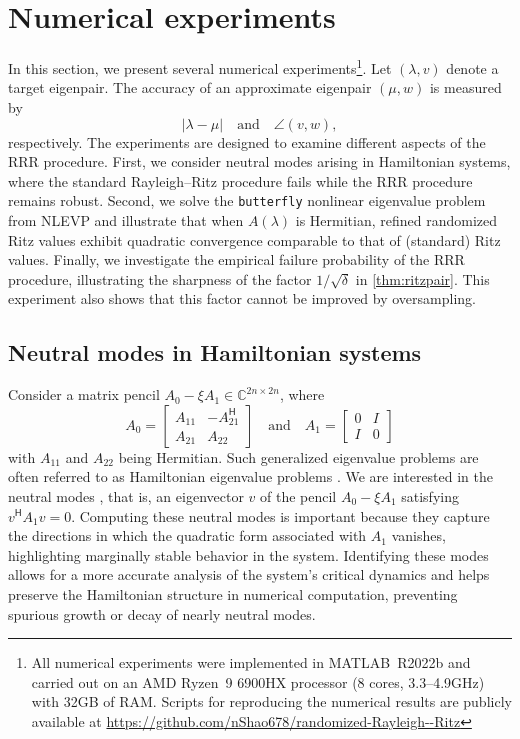\documentclass[a4paper,11pt]{article}
\newcommand{\Htran}{\mathsf{H}}
\newcommand{\C}{\mathbb{C}}
\providecommand{\abs}[1]{\lvert#1\rvert}
\begin{document}
\section{Numerical experiments}
\label{sec:numexp}
In this section, we present several numerical experiments\footnote{All numerical experiments were implemented in MATLAB~R2022b and carried out on an AMD Ryzen~9 6900HX processor (8 cores, 3.3--4.9GHz) with 32GB of RAM. Scripts for reproducing the numerical results are publicly available at \url{https://github.com/nShao678/randomized-Rayleigh--Ritz}}.
Let $(\lambda,v)$ denote a target eigenpair. The accuracy of an approximate eigenpair $(\mu,w)$ is measured by
\begin{equation}
    \label{exp:err}
    \abs{\lambda-\mu} \quad\text{and}\quad \angle(v,w),
\end{equation}
respectively.
The experiments are designed to examine different aspects of the RRR procedure. First, we consider neutral modes arising in Hamiltonian systems, where the standard Rayleigh--Ritz procedure fails while the RRR procedure remains robust. Second, we solve the \texttt{butterfly} nonlinear eigenvalue problem from NLEVP \cite{Betcke2013} and illustrate that when $A(\lambda)$ is Hermitian, refined randomized Ritz values exhibit quadratic convergence comparable to that of (standard) Ritz values. Finally, we investigate the empirical failure probability of the RRR procedure, illustrating the sharpness of the factor $1/\sqrt{\delta}$ in \cref{thm:ritzpair}. 
This experiment also shows that this factor cannot be improved by oversampling.



\subsection{Neutral modes in Hamiltonian systems}
Consider a matrix pencil $A_{0}-\xi A_{1}\in\C^{2n\times 2n}$, where 
\begin{equation*}
    A_{0} = \begin{bmatrix}
        A_{11} & -A_{21}^{\Htran}\\ 
        A_{21} & A_{22}
    \end{bmatrix}
    \quad\text{and}\quad 
    A_{1}=\begin{bmatrix}
    0 & I\\ 
    I & 0
\end{bmatrix}
\end{equation*}
with $A_{11}$ and $A_{22}$ being Hermitian. Such generalized eigenvalue problems are often referred to as Hamiltonian eigenvalue problems \cite{Benner2005}. We are interested in the neutral modes \cite{Bognar1974}, that is, an eigenvector $v$ of the pencil $A_{0}-\xi A_{1}$ satisfying $v^{\Htran} A_{1} v = 0$.
Computing these neutral modes is important because they capture the directions in which the quadratic form associated with $A_{1}$ vanishes, highlighting marginally stable behavior in the system. Identifying these modes allows for a more accurate analysis of the system's critical dynamics and helps preserve the Hamiltonian structure in numerical computation, preventing spurious growth or decay of nearly neutral modes.
\end{document}
